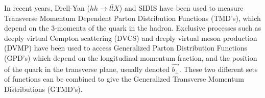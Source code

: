 In recent years, Drell-Yan ($hh \rightarrow l \bar{l}X$) and SIDIS have been used to measure Transverse Momentum Dependent Parton Distribution Functions (TMD's), which depend on the 3-momenta of the quark in the hadron.  Exclusive processes such as deeply virtual Compton scattering (DVCS) and deeply virtual meson production (DVMP) have been used to access Generalized Parton Distribution Functions (GPD's) which depend on the longitudinal momentum fraction, and the position of the quark in the transverse plane, usually denoted $\vec{b_{\perp}}$.  These two different sets of functions can be combined to give the Generalized Transverse Momentum Distributions (GTMD's). \\






